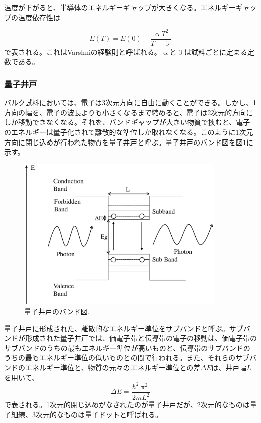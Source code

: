 \documentclass[11pt,a4j]{jsarticle}
\begin{document}
温度が下がると、半導体のエネルギーギャップが大きくなる。エネルギーギャップの温度依存性は

\begin{equation}
 E(T)=E(0)-\frac{\upalpha T^{2}}{T+\upbeta}
 \label{eq_varshni}
\end{equation}
で表される\cite{varshni}。これはVarshniの経験則と呼ばれる。$\upalpha$と$\upbeta$は試料ごとに定まる定数である。



\newpage
\subsubsection{量子井戸}
バルク試料においては、電子は3次元方向に自由に動くことができる。しかし、1方向の幅を、電子の波長よりも小さくなるまで縮めると、電子は2次元的方向にしか移動できなくなる。それを、バンドギャップが大きい物質で挟むと、電子のエネルギーは量子化されて離散的な準位しか取れなくなる。このように1次元方向に閉じ込めが行われた物質を量子井戸と呼ぶ。量子井戸のバンド図を図\ref{fig_qw1}に示す。

\begin{figure}[h]
 \centering
 \includegraphics[clip,width=10cm]{start_subband.eps}
 \caption{量子井戸のバンド図.}
 \label{fig_qw1}
\end{figure}

量子井戸に形成された、離散的なエネルギー準位をサブバンドと呼ぶ。サブバンドが形成された量子井戸では、価電子帯と伝導帯の電子の移動は、価電子帯のサブバンドのうちの最もエネルギー準位が高いものと、伝導帯のサブバンドのうちの最もエネルギー準位の低いものとの間で行われる。また、それらのサブバンドのエネルギー準位と、物質の元々のエネルギー準位との差$\Delta E$は、井戸幅$L$を用いて、
\begin{equation}
 \Delta E=\frac{\mathrm{\hbar}^{2}\uppi^{2}}{2mL^{2}}
 \label{eq_qw}
\end{equation}
で表される。1次元的閉じ込めがなされたのが量子井戸だが、2次元的なものは量子細線、3次元的なものは量子ドットと呼ばれる。
\end{document}
